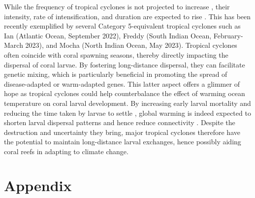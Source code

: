\documentclass[fleqn,10pt]{wlscirep}
\newcommand{\emphc}[1]{\emph{\textcolor{red}{#1}}}
\begin{document}
While the frequency of tropical cyclones is not projected to increase \citep{walsh2019tropical}, their intensity, rate of intensification, and duration are expected to rise \citep{bhatia2022potential}. This has been recently exemplified by several Category 5-equivalent tropical cyclones such as Ian (Atlantic Ocean, September 2022), Freddy (South Indian Ocean, February-March 2023), and Mocha (North Indian Ocean, May 2023). Tropical cyclones often coincide with coral spawning seasons, thereby directly impacting the dispersal of coral larvae. By fostering long-distance dispersal, they can facilitate genetic mixing, which is particularly beneficial in promoting the spread of disease-adapted or warm-adapted genes. This latter aspect offers a glimmer of hope as tropical cyclones could help counterbalance the effect of warming ocean temperature on coral larval development. By increasing early larval mortality and reducing the time taken by larvae to settle \citep{nozawa2007effects, heyward2010plasticity}, global warming is indeed expected to shorten larval dispersal patterns and hence reduce connectivity \citep{Figueiredo2022Jan}. Despite the destruction and uncertainty they bring, major tropical cyclones therefore have the potential to maintain long-distance larval exchanges, hence possibly aiding coral reefs in adapting to climate change.



\section*{Appendix}
\end{document}
